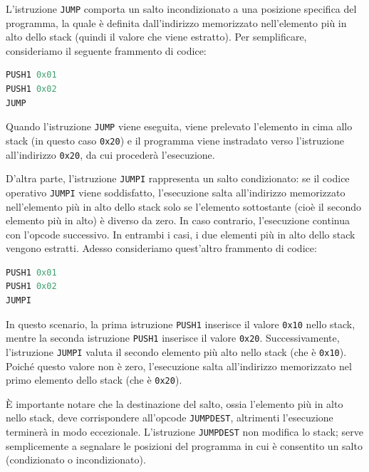 L’istruzione {\tt JUMP} comporta un salto incondizionato a una posizione specifica del programma, la quale è definita dall’indirizzo memorizzato nell’elemento 
più in alto dello stack (quindi il valore che viene estratto). Per semplificare, consideriamo il seguente frammento di codice:
\begin{algorithm}[ht]
\caption{Esempio di EVM bytecode con l'opcode {\tt JUMP}.}
\label{lst:jump}
\begin{lstlisting}[style=customsolidity, language=C, numbers=none]
PUSH1 0x01
PUSH1 0x02
JUMP
\end{lstlisting}
\end{algorithm}

Quando l’istruzione {\tt JUMP} viene eseguita, viene prelevato l’elemento in cima allo stack (in questo caso {\tt 0x20}) e il programma viene instradato verso 
l’istruzione all’indirizzo {\tt 0x20}, da cui procederà l’esecuzione.

D’altra parte, l’istruzione {\tt JUMPI} rappresenta un salto condizionato: se il codice operativo {\tt JUMPI} viene soddisfatto, l’esecuzione salta all’indirizzo 
memorizzato nell’elemento più in alto dello stack solo se l’elemento sottostante (cioè il secondo elemento più in alto) è diverso da zero. In caso contrario, 
l’esecuzione continua con l’opcode successivo. In entrambi i casi, i due elementi più in alto dello stack vengono estratti. 
Adesso consideriamo quest’altro frammento di codice:

\begin{algorithm}[ht]
\caption{Esempio di EVM bytecode con l'opcode {\tt JUMPI}.}
\label{lst:jumpi}
\begin{lstlisting}[style=customsolidity, language=C, numbers=none]
PUSH1 0x01
PUSH1 0x02
JUMPI
\end{lstlisting}
\end{algorithm}

In questo scenario, la prima istruzione {\tt PUSH1} inserisce il valore {\tt 0x10} nello stack, mentre la seconda istruzione {\tt PUSH1} inserisce il valore {\tt 0x20}. 
Successivamente, l’istruzione {\tt JUMPI} valuta il secondo elemento più alto nello stack (che è {\tt 0x10}). Poiché questo valore non è zero, l’esecuzione 
salta all’indirizzo memorizzato nel primo elemento dello stack (che è {\tt 0x20}).

È importante notare che la destinazione del salto, ossia l’elemento più in alto nello stack, deve corrispondere all’opcode {\tt JUMPDEST}, altrimenti 
l’esecuzione terminerà in modo eccezionale. L’istruzione {\tt JUMPDEST} non modifica lo stack; serve semplicemente a segnalare le posizioni del programma 
in cui è consentito un salto (condizionato o incondizionato).

